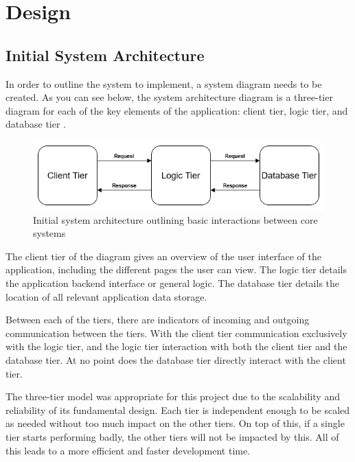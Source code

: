 \documentclass{l4proj}
\begin{document}
\chapter{Design}
\section{Initial System Architecture}
In order to outline the system to implement, a system diagram needs to be created. As you can see below, the system architecture diagram is a three-tier diagram for each of the key elements of the application: client tier, logic tier, and database tier \citep{aarsten1996patterns}. 

\begin{figure}[H]
    \centering
    \includegraphics[width=0.9\linewidth]{images/initial_arch.png}   
    \caption{Initial system architecture outlining basic interactions between core systems}
    \label{fig:initial_arch} 
\end{figure}

The client tier of the diagram gives an overview of the user interface of the application, including the different pages the user can view. The logic tier details the application backend interface or general logic. The database tier details the location of all relevant application data storage.
\newline

Between each of the tiers, there are indicators of incoming and outgoing communication between the tiers. With the client tier communication exclusively with the logic tier, and the logic tier interaction with both the client tier and the database tier. At no point does the database tier directly interact with the client tier.
\newline

The three-tier model was appropriate for this project due to the scalability and reliability of its fundamental design. Each tier is independent enough to be scaled as needed without too much impact on the other tiers. On top of this, if a single tier starts performing badly, the other tiers will not be impacted by this. All of this leads to a more efficient and faster development time.
\end{document}
